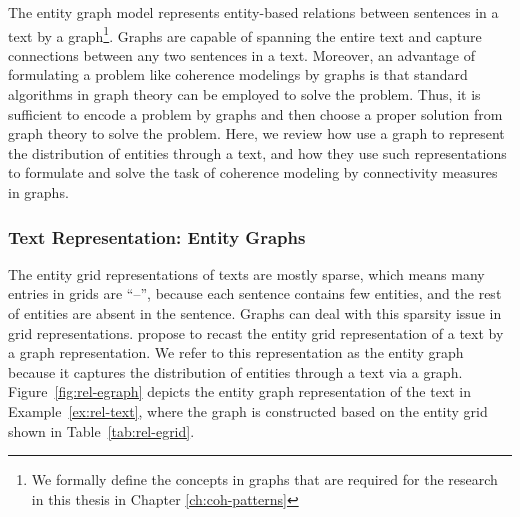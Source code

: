 The entity graph model \cite{guinaudeau13} represents entity-based relations between sentences in a text by a graph\footnote{We formally define the concepts in graphs that are required for the research in this thesis in Chapter \ref{ch:coh-patterns}}. 
Graphs are capable of spanning the entire text and capture connections between any two sentences in a text. 
Moreover, an advantage of formulating a problem like coherence modelings by graphs is that standard algorithms in graph theory can be employed to solve the problem. 
Thus, it is sufficient to encode a problem by graphs and then choose a proper solution from graph theory to solve the problem. 
Here, we review how  use a graph to represent the distribution of entities through a text, and how they use such representations to formulate and solve the task of coherence modeling by connectivity measures in graphs. 

\subsubsection{Text Representation: Entity Graphs}

The entity grid representations of texts are mostly sparse, which means many entries in grids are ``--'', because each sentence contains few entities, and the rest of entities are absent in the sentence. 
Graphs can deal with this sparsity issue in grid representations. 
 propose to recast the entity grid representation of a text by a graph representation. 
We refer to this representation as the entity graph because it captures the distribution of entities through a text via a graph. 
Figure~\ref{fig:rel-egraph} depicts the entity graph representation of the text in Example~\ref{ex:rel-text}, where the graph is constructed based on the entity grid shown in Table~\ref{tab:rel-egrid}. 

